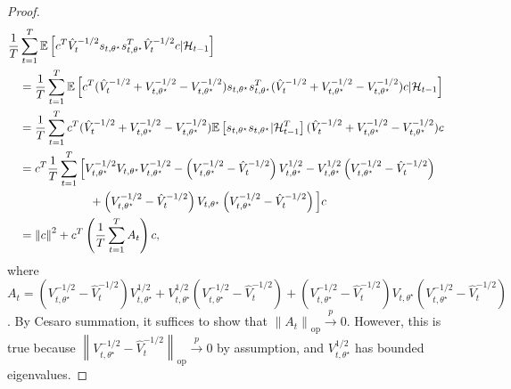 \documentclass[11pt]{article}
\newcommand{\E}{\mathbb{E}}
\newcommand{\norm}[1]{\left\lVert#1\right\rVert}
\begin{document}
\begin{appendix}
\begin{proof}
\begin{align*}\frac{1}{T}  &\sum_{t=1}^{T} \E\left[c^{T}\hat{V}_{t}^{-1/2} s_{t,\theta^{\star}} s_{t,\theta^{\star}}^{T}    \hat{V}_{t}^{-1/2}c |\mathcal{H}_{t-1}\right] \\
&= \frac{1}{T}  \sum_{t=1}^{T} \E\left[c^{T}( \hat{V}_{t}^{-1/2} + V_{t,\theta^{\star}}^{-1/2} - V_{t,\theta^{\star}}^{-1/2}   )s_{t,\theta^{\star}} s_{t,\theta^{\star}}^{T}  ( \hat{V}_{t}^{-1/2} + V_{t,\theta^{\star}}^{-1/2} - V_{t,\theta^{\star}}^{-1/2}   )c  |\mathcal{H}_{t-1}\right]
\\
&= \frac{1}{T}  \sum_{t=1}^{T} c^{T}( \hat{V}_{t}^{-1/2} + V_{t,\theta^{\star}}^{-1/2} - V_{t,\theta^{\star}}^{-1/2}   )\E\left[s_{t,\theta^{\star}}s_{t,\theta^{\star}}  |\mathcal{H}_{t-1}  ^{T}  \right] ( \hat{V}_{t}^{-1/2} + V_{t,\theta^{\star}}^{-1/2} - V_{t,\theta^{\star}}^{-1/2}   )c \\  
&=c^{T} \frac{1}{T} \sum_{t=1}^{T} \Big[V_{t,\theta^{\star}}^{-1/2} V_{t,\theta^{\star}} V_{t,\theta^{\star}}^{-1/2} - \left(V_{t,\theta^{\star}}^{-1/2} - \hat{V}_{t}^{-1/2}\right)  V_{t,\theta^{\star}}^{1/2} - V_{t,\theta^{\star}}^{1/2} \left(V_{t,\theta^{\star}}^{-1/2} - \hat{V}_{t}^{-1/2}\right)  & \\
&\hspace*{6em} +\left(V_{t,\theta^{\star}}^{-1/2} - \hat{V}_{t}^{-1/2}\right)  V_{t,\theta^{\star}} \left(V_{t,\theta^{\star}}^{-1/2} - \hat{V}_{t}^{-1/2}\right)\Big] c \\
& = \norm{c}^{2} + c^{T}\left( \frac{1}{T}\sum_{t=1}^{T}A_{t}\right)c,
\end{align*}
where $A_{t}  =\left(V_{t,\theta^{\star}}^{-1/2} - \hat{V}_{t}^{-1/2}\right)  V_{t,\theta^{\star}}^{1/2} + V_{t,\theta^{\star}}^{1/2} \left(V_{t,\theta^{\star}}^{-1/2} - \hat{V}_{t}^{-1/2}\right)  +\left(V_{t,\theta^{\star}}^{-1/2} - \hat{V}_{t}^{-1/2}\right)  V_{t,\theta^{\star}} \left(V_{t,\theta^{\star}}^{-1/2} - \hat{V}_{t}^{-1/2}\right)$.
By Cesaro summation, it suffices to show that $\norm{A_{t}}_{\text{op}} \overset{p}{\to} 0$. However, this is true because $\norm{V_{t,\theta^{\star}}^{-1/2} - \hat{V}_{t}^{-1/2}}_{\text{op}} \overset{p}{\to} 0 $ by assumption, and $V_{t,\theta^{\star}}^{1/2}$ has bounded eigenvalues. 

\end{proof}
\end{appendix}
\end{document}
